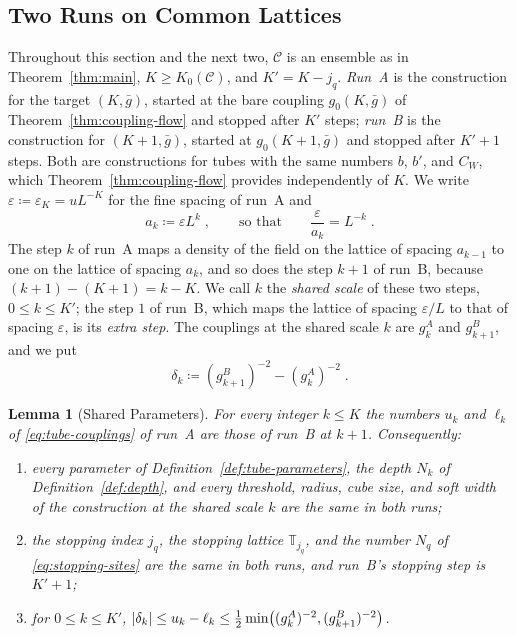 \documentclass[11pt]{preprint}
\DeclarePairedDelimiter{\abs}{\lvert}{\rvert}
\numberwithin{equation}{section}
\newtheorem{lemma}[theorem]{Lemma}
\theoremstyle{definition}
\theoremstyle{remark}
\theoremstyle{plain}
\begin{document}
\subsection{Two Runs on Common Lattices}\label{sec:two-runs}

Throughout this section and the next two, $\mathcal C$ is an ensemble as in Theorem~\ref{thm:main}, $K \geq K_0(\mathcal C)$, and $K' = K - j_q$. \emph{Run~A} is the construction for the target $(K, \bar g)$, started at the bare coupling $g_0(K, \bar g)$ of Theorem~\ref{thm:coupling-flow} and stopped after $K'$ steps; \emph{run~B} is the construction for $(K + 1, \bar g)$, started at $g_0(K + 1, \bar g)$ and stopped after $K' + 1$ steps. Both are constructions for tubes with the same numbers $b$, $b'$, and $C_W$, which Theorem~\ref{thm:coupling-flow} provides independently of $K$. We write $\varepsilon \coloneqq \varepsilon_K = uL^{-K}$ for the fine spacing of run~A and
\begin{equation}\label{eq:shared-spacing}
    a_k \coloneqq \varepsilon L^k\;,
    \qquad\text{so that}\qquad
    \frac{\varepsilon}{a_k} = L^{-k}\;.
\end{equation}
The step $k$ of run~A maps a density of the field on the lattice of spacing $a_{k-1}$ to one on the lattice of spacing $a_k$, and so does the step $k + 1$ of run~B, because $(k + 1) - (K + 1) = k - K$. We call $k$ the \emph{shared scale} of these two steps, $0 \leq k \leq K'$; the step $1$ of run~B, which maps the lattice of spacing $\varepsilon/L$ to that of spacing $\varepsilon$, is its \emph{extra step}. The couplings at the shared scale $k$ are $g^A_k$ and $g^B_{k+1}$, and we put
\begin{equation}\label{eq:coupling-difference}
    \delta_k \coloneqq (g^B_{k+1})^{-2} - (g^A_k)^{-2}\;.
\end{equation}

\begin{lemma}[Shared Parameters]\label{lem:shared-parameters}
For every integer $k \leq K$ the numbers $u_k$ and $\ell_k$ of \eqref{eq:tube-couplings} of run~A are those of run~B at $k + 1$. Consequently:
\begin{enumerate}[label=(\roman*)]
\item every parameter of Definition~\ref{def:tube-parameters}, the depth $N_k$ of Definition~\ref{def:depth}, and every threshold, radius, cube size, and soft width of the construction at the shared scale $k$ are the same in both runs;
\item the stopping index $j_q$, the stopping lattice $\mathbb T_{j_q}$, and the number $N_q$ of \eqref{eq:stopping-sites} are the same in both runs, and run~B's stopping step is $K' + 1$;
\item for $0 \leq k \leq K'$, $\abs{\delta_k} \leq u_k - \ell_k \leq \frac12\min\bigl((g^A_k)^{-2}, (g^B_{k+1})^{-2}\bigr)$.
\end{enumerate}
\end{lemma}
\end{document}
